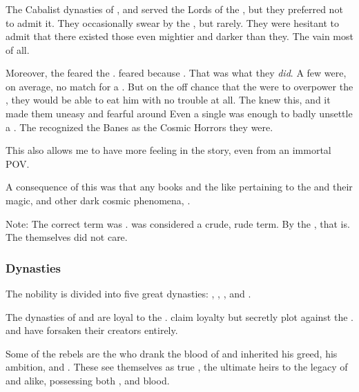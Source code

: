 \subsubsection{\Banes}
The Cabalist dynasties of \KiriathSepher, \TiphredSerah{} and \Mystraacht{} served the Lords of the \SitraAchras, but they preferred not to admit it. 
They occasionally swear by the \banelords, but rarely. 
They were hesitant to admit that there existed those even mightier and darker than they. 
The vain \KiriathSepher{} most of all.

Moreover, the \resphain feared the \banes. 
\Resphain feared \banes because . 
That was what they \emph{did}. 
A few \lesserbanes were, on average, no match for a \resphan. 
But on the off chance that the \banes were to overpower the \resphan, they would be able to eat him with no trouble at all. 
The \resphain knew this, and it made them uneasy and fearful around \banes 
Even a single \lesserbane was enough to badly unsettle a \resphan. 
The \resphain recognized the Banes as the Cosmic Horrors they were.

This also allows me to have more  feeling in the story, even from an immortal POV.

A consequence of this was that any books and the like pertaining to the \SitraAchras and their magic, and other dark cosmic phenomena, . 

Note: 
The correct term was . 
\quo{\Banelord} was considered a crude, rude term. 
By the \resphain, that is. 
The \banes themselves did not care. 





\subsubsection{Dynasties}
The \resphan{} nobility is divided into five great dynasties: 
\KiriathSepher, \TiphredSerah, \Mystraacht, \Kezerad{} and \Baelzerach. 

The dynasties of \KiriathSepher{} and \TiphredSerah{} are loyal to the \SitraAchras. 
\Mystraacht{} claim loyalty but secretly plot against the \SitraAchras. 
\Kezerad{} and \Baelzerach{} have forsaken their creators entirely. 

Some of the rebels are the \satharioth{} who drank the blood of \Nexagglachel{} and inherited his greed, his ambition, and . 
These \resphain{} see themselves as true \Miithians, the ultimate heirs to the legacy of \Miith{} and \Erebos{} alike, possessing both \nephilic, \draconic{} and \bane blood. 

